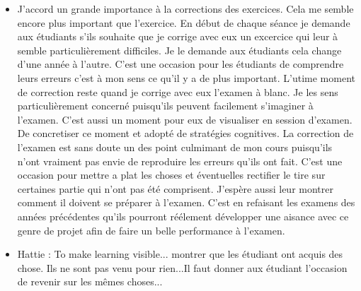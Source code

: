 \begin{itemize}
    \item J'accord un grande importance à la corrections des exercices. Cela me semble encore plus important que l'exercice. En début de chaque séance je demande aux étudiants s'ils souhaite que je corrige avec eux un excercice qui leur à semble particulièrement difficiles. Je le demande aux étudiants cela change d'une année à l'autre. C'est une occasion pour les étudiants de comprendre leurs erreurs c'est à mon sens ce qu'il y a de plus important. L'utime moment de correction reste quand je corrige avec eux l'examen à blanc. Je les sens particulièrement concerné puisqu'ils peuvent facilement s'imaginer à l'examen. C'est aussi un moment pour eux de visualiser en session d'examen. De concretiser ce moment et adopté de stratégies cognitives. La correction de l'examen est sans doute un des point culmimant de mon cours puisqu'ils n'ont vraiment pas envie de reproduire les erreurs qu'ils ont fait. C'est une occasion pour mettre a plat les choses et éventuelles rectifier le tire sur certaines partie qui n'ont pas été comprisent. J'espère aussi leur montrer comment il doivent se préparer à l'examen. C'est en refaisant les examens des années précédentes qu'ils pourront réélement développer une aisance avec ce genre de projet afin de faire un belle performance à l'examen.
    \item Hattie : To make learning visible... montrer que les étudiant ont acquis des chose. Ils ne sont pas venu pour rien...Il faut donner aux étudiant l'occasion de revenir sur les mêmes choses...
\end{itemize}

